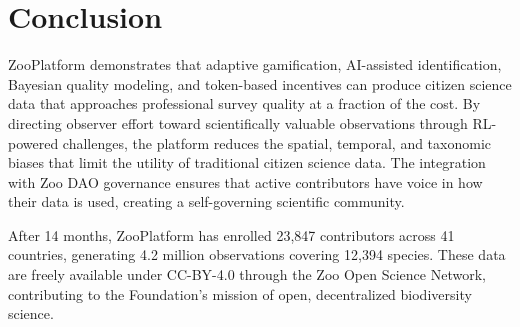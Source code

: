 \documentclass[11pt,a4paper]{article}
\begin{document}
\section{Conclusion}
\label{sec:conclusion}

ZooPlatform demonstrates that adaptive gamification, AI-assisted
identification, Bayesian quality modeling, and token-based incentives
can produce citizen science data that approaches professional survey
quality at a fraction of the cost. By directing observer effort toward
scientifically valuable observations through RL-powered challenges,
the platform reduces the spatial, temporal, and taxonomic biases that
limit the utility of traditional citizen science data. The integration
with Zoo DAO governance ensures that active contributors have voice in
how their data is used, creating a self-governing scientific community.

After 14 months, ZooPlatform has enrolled 23{,}847 contributors across
41 countries, generating 4.2 million observations covering 12{,}394
species. These data are freely available under CC-BY-4.0 through the Zoo
Open Science Network, contributing to the Foundation's mission of open,
decentralized biodiversity science.




\end{document}
